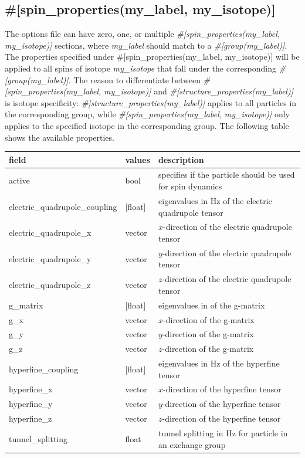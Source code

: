 \documentclass{book}
\begin{document}
\subsection{\#[spin\_properties(my\_label, my\_isotope)]}
The options file can have zero, one, or multiple 
\textit{\#[spin\_properties(my\_label, my\_isotope)]} 
sections, where \textit{my\_label} should match to a 
\textit{\#[group(my\_label)]}.
The properties specified under  
{\#[spin\_properties(my\_label, my\_isotope)]} will be applied
to all spins of isotope \textit{my\_isotope} that fall under the corresponding
\textit{\#[group(my\_label)]}.
The reason to differentiate between 
\textit{\#[spin\_properties(my\_label, }
\textit{my\_isotope)]}
and \textit{\#[structure\_properties(my\_label)]}
is isotope specificity:
\textit{\#[structure\_properties(my\_label)]} applies to all
particles in the corresponding group, while 
\textit{\#[spin\_properties(my\_label, }
\textit{my\_isotope)]}
only applies to the specified isotope in the corresponding group.
The following table shows the available properties.
\begin{center}
\begin{tabular}{| m{20em} | m{1.5cm}| m{7cm} |}
 \hline 
 \textbf{field} & \textbf{values} & \textbf{description} \\ 
 \hline 
 active & bool & 
 specifies if the particle should be used for spin dynamics\\
 \hline 
 electric\_quadrupole\_coupling & [float] & 
 eigenvalues in Hz of the electric quadrupole tensor\\
 \hline 
 electric\_quadrupole\_x & 
 vector & $x$-direction of the electric quadrupole tensor\\
 \hline 
 electric\_quadrupole\_y & 
 vector & $y$-direction of the electric quadrupole tensor\\
 \hline 
 electric\_quadrupole\_z & 
 vector & $z$-direction of the electric quadrupole tensor\\
 \hline 
 g\_matrix & [float] & eigenvalues in of the g-matrix\\
 \hline 
 g\_x & vector & $x$-direction of the g-matrix\\
 \hline 
 g\_y & vector & $y$-direction of the g-matrix\\
 \hline 
 g\_z & vector & $z$-direction of the g-matrix\\
 \hline 
 hyperfine\_coupling & [float] & eigenvalues in Hz of the hyperfine tensor\\
 \hline 
 hyperfine\_x & vector & $x$-direction of the hyperfine tensor\\
 \hline 
 hyperfine\_y & vector & $y$-direction of the hyperfine tensor\\
 \hline 
 hyperfine\_z & vector & $z$-direction of the hyperfine tensor\\
 \hline 
 tunnel\_splitting & float & 
 tunnel splitting in Hz for particle in an exchange group \\
 \hline 
\end{tabular}
\end{center} 
\end{document}
